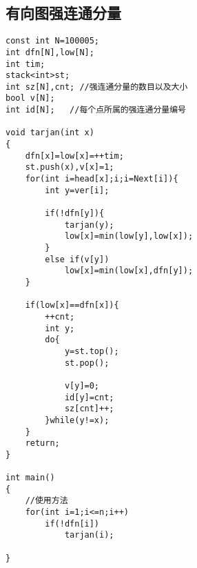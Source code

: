 \documentclass[twocolumn,a4]{article}
\begin{document}
\subsection{有向图强连通分量}
\begin{lstlisting}
const int N=100005;
int dfn[N],low[N];
int tim;
stack<int>st;
int sz[N],cnt; //强连通分量的数目以及大小
bool v[N];
int id[N];   //每个点所属的强连通分量编号

void tarjan(int x)
{
    dfn[x]=low[x]=++tim;
    st.push(x),v[x]=1;
    for(int i=head[x];i;i=Next[i]){
        int y=ver[i];
        
        if(!dfn[y]){
            tarjan(y);
            low[x]=min(low[y],low[x]);
        }
        else if(v[y])
            low[x]=min(low[x],dfn[y]);
    }
    
    if(low[x]==dfn[x]){
        ++cnt;
        int y;
        do{
            y=st.top();
            st.pop();
            
            v[y]=0;
            id[y]=cnt;
            sz[cnt]++;
        }while(y!=x);
    }
    return;
}

int main()
{
    //使用方法
    for(int i=1;i<=n;i++)
        if(!dfn[i])
            tarjan(i);

}
\end{lstlisting}
\end{document}
